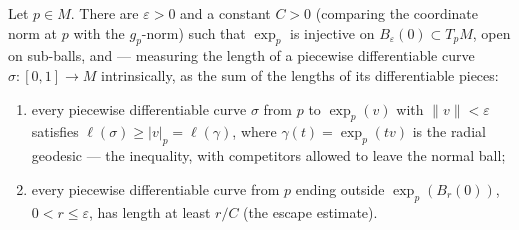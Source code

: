 \begin{lemma}
  \label{lem:dc-ch3-3-6-competitor}
  \leanok
  Let $p\in M$. There are $\varepsilon>0$ and a constant $C>0$ (comparing the
  coordinate norm at $p$ with the $g_p$-norm) such that $\exp_p$ is injective
  on $B_\varepsilon(0)\subset T_pM$, open on sub-balls, and — measuring the
  length of a piecewise differentiable curve $\sigma:[0,1]\to M$
  intrinsically, as the sum of the lengths of its differentiable pieces:
  \begin{enumerate}
  \item every piecewise differentiable curve $\sigma$ from $p$ to
    $\exp_p(v)$ with $\|v\|<\varepsilon$ satisfies
    $\ell(\sigma)\ge|v|_p=\ell(\gamma)$, where $\gamma(t)=\exp_p(tv)$ is the
    radial geodesic — the inequality, with competitors allowed to
    leave the normal ball;
  \item every piecewise differentiable curve from $p$ ending outside
    $\exp_p(B_r(0))$, $0<r\le\varepsilon$, has length at least $r/C$ (the
    escape estimate).
  \end{enumerate}
\end{lemma}
